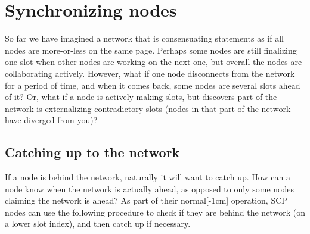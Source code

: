 \section{Synchronizing nodes}
\label{sec:consensus-synchronizing-nodes}

So far we have imagined a network that is consensuating statements as if all nodes are more-or-less on the same page. Perhaps some nodes are still finalizing one slot when other nodes are working on the next one, but overall the nodes are collaborating actively. However, what if one node disconnects from the network for a period of time, and when it comes back, some nodes are several slots ahead of it? Or, what if a node is actively making slots, but discovers part of the network is externalizing contradictory slots (nodes in that part of the network have diverged from you)?


\subsection{Catching up to the network}
\label{subsec:consensus-catching-up}

If a node is behind the network, naturally it will want to catch up. How can a node know when the network is actually ahead, as opposed to only some nodes claiming the network is ahead? As part of their normal[-1cm] operation, SCP nodes can use the following procedure to check if they are behind the network (on a lower slot index), and then catch up if necessary.


